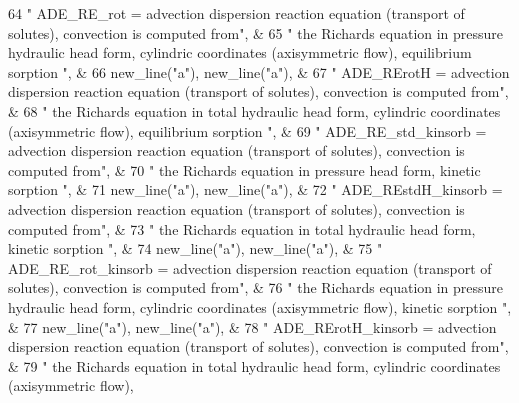 \begin{DoxyCode}
64         \textcolor{stringliteral}{"   ADE\_RE\_rot = advection dispersion reaction equation (transport of solutes), convection is
       computed from"}\textcolor{comment}{, &}
65 \textcolor{comment}{        }\textcolor{stringliteral}{" the Richards equation in pressure hydraulic head form, cylindric coordinates (axisymmetric flow),
       equilibrium sorption "}\textcolor{comment}{, &}
66 \textcolor{comment}{                new\_line(}\textcolor{stringliteral}{"a"}),  new\_line(\textcolor{stringliteral}{"a"}), &
67         \textcolor{stringliteral}{"   ADE\_RErotH = advection dispersion reaction equation (transport of solutes), convection is
       computed from"}\textcolor{comment}{, &}
68 \textcolor{comment}{        }\textcolor{stringliteral}{" the Richards equation in total hydraulic head form, cylindric coordinates (axisymmetric flow),
       equilibrium sorption "}\textcolor{comment}{, &}
69 \textcolor{comment}{                }\textcolor{stringliteral}{"   ADE\_RE\_std\_kinsorb = advection dispersion reaction equation (transport of solutes),
       convection is computed from"}\textcolor{comment}{, &}
70 \textcolor{comment}{        }\textcolor{stringliteral}{" the Richards equation in pressure head form, kinetic sorption "}, &
71         new\_line(\textcolor{stringliteral}{"a"}),  new\_line(\textcolor{stringliteral}{"a"}), &
72         \textcolor{stringliteral}{"   ADE\_REstdH\_kinsorb = advection dispersion reaction equation (transport of solutes), convection
       is computed from"}\textcolor{comment}{, &}
73 \textcolor{comment}{        }\textcolor{stringliteral}{" the Richards equation in total hydraulic head form, kinetic sorption "}\textcolor{comment}{, &}
74 \textcolor{comment}{                new\_line(}\textcolor{stringliteral}{"a"}),  new\_line(\textcolor{stringliteral}{"a"}), &
75         \textcolor{stringliteral}{"   ADE\_RE\_rot\_kinsorb = advection dispersion reaction equation (transport of solutes), convection
       is computed from"}\textcolor{comment}{, &}
76 \textcolor{comment}{        }\textcolor{stringliteral}{" the Richards equation in pressure hydraulic head form, cylindric coordinates (axisymmetric flow),
       kinetic sorption "}\textcolor{comment}{, &}
77 \textcolor{comment}{                new\_line(}\textcolor{stringliteral}{"a"}),  new\_line(\textcolor{stringliteral}{"a"}), &
78         \textcolor{stringliteral}{"   ADE\_RErotH\_kinsorb = advection dispersion reaction equation (transport of solutes), convection
       is computed from"}\textcolor{comment}{, &}
79 \textcolor{comment}{        }\textcolor{stringliteral}{" the Richards equation in total hydraulic head form, cylindric coordinates (axisymmetric flow),
}
\end{DoxyCode}
